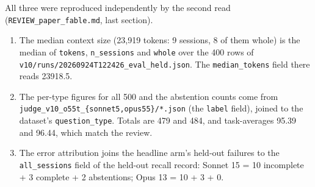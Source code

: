 \documentclass[11pt]{article}
\providecommand{\tightlist}{\setlength{\itemsep}{0pt}\setlength{\parskip}{0pt}}
\begin{document}
All three were reproduced independently by the second read (\texttt{REVIEW\_paper\_fable.md}, last section).

\begin{enumerate}
\def\labelenumi{\arabic{enumi}.}
\tightlist
\item
  The median context size (23,919 tokens: 9 sessions, 8 of them whole) is the median of \texttt{tokens},
  \texttt{n\_sessions} and \texttt{whole} over the 400 rows of \texttt{v10/runs/20260924T122426\_eval\_held.json}. The
  \texttt{median\_tokens} field there reads 23918.5.
\item
  The per-type figures for all 500 and the abstention counts come from
  \texttt{judge\_v10\_o55t\_\{sonnet5,opus55\}/*.json} (the \texttt{label} field), joined to the dataset's \texttt{question\_type}.
  Totals are 479 and 484, and task-averages 95.39 and 96.44, which match the review.
\item
  The error attribution joins the headline arm's held-out failures to the \texttt{all\_sessions} field of the
  held-out recall record: Sonnet 15 = 10 incomplete + 3 complete + 2 abstentions; Opus 13 = 10 + 3 + 0.
\end{enumerate}
\end{document}
